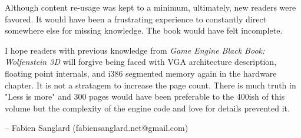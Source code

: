 \par
Although content re-usage was kept to a minimum, ultimately, new readers were favored. It would have been a frustrating experience to constantly direct somewhere else for missing knowledge. The book would have felt incomplete.\\
\par
I hope readers with previous knowledge from \textit{Game Engine Black Book: Wolfenstein 3D} will forgive being faced with VGA architecture description, floating point internals, and i386 segmented memory again in the hardware chapter. It is not a stratagem to increase the page count. There is much truth in "Less is more" and 300 pages would have been preferable to the 400ish of this volume but the complexity of the engine code and love for details prevented it.\\
\par
-- Fabien Sanglard (fabiensanglard.net@gmail.com)